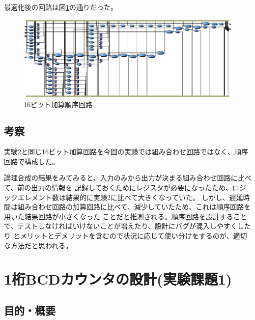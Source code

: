 \documentclass[uplatex]{jsarticle}
\begin{document}
最適化後の回路は図\ref{fig:14}の通りだった。

\begin{figure}[htb]
  \begin{center}
    \includegraphics[width=13cm]{images/fig14.eps}
    \caption{16ビット加算順序回路}
    \label{fig:14}
  \end{center}
\end{figure}

\subsection{考察}

実験2と同じ16ビット加算回路を今回の実験では組み合わせ回路ではなく、順序回路で構成した。

論理合成の結果をみてみると、入力のみから出力が決まる組み合わせ回路に比べて、前の出力の情報を
記録しておくためにレジスタが必要になったため、ロジックエレメント数は結果的に実験2に比べて大きくなっていた。
しかし、遅延時間は組み合わせ回路の加算回路に比べて、減少していたため、これは順序回路を用いた結果回路が小さくなった
ことだと推測される。順序回路を設計することで、テストしなければいけないことが増えたり、設計にバグが混入しやすくしたり
とメリットとデメリットを含むので状況に応じて使い分けをするのが、適切な方法だと思われる。


\clearpage

\section{1桁BCDカウンタの設計(実験課題1)}

\subsection{目的・概要}
\end{document}

